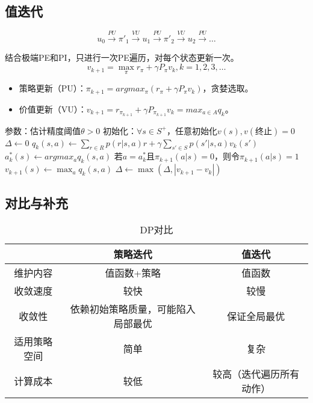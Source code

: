 \documentclass[
12pt, %
a4paper, 
oneside, %
headinclude,footinclude, %
]{scrartcl}
\begin{document}
\subsection[值迭代]{值迭代}
$$ u_0 \xrightarrow{PU} \pi'_1 \xrightarrow{VU} u_1 \xrightarrow{PU} \pi'_2 \xrightarrow{VU} u_2 \xrightarrow{PU} \dots $$

结合极端PE和PI，只进行一次PE遍历，对每个状态更新一次。
$$ v_{k + 1} = \max_{\pi} r_{\pi} + \gamma P_{\pi}v_k, k = 1, 2, 3, \dots $$
\begin{itemize}
\item 策略更新（PU）：$ \pi_{k + 1} = argmax_{\pi}(r_{\pi} + \gamma P_{\pi}v_k) $，贪婪选取。
\item 价值更新（VU）：$ v_{k + 1} = r_{\pi_{k + 1}} + \gamma P_{\pi_{k + 1}}v_k = max_{a \in A} q_k $。
\end{itemize}
\begin{myalgorithm}[值迭代]
\State 参数：估计精度阈值$ \theta > 0 $
\State 初始化：$ \forall s \in S^+ $，任意初始化$ v(s), v(\text{终止}) = 0 $
\Repeat
\State $ \Delta \gets 0 $
\State $ q_k(s, a) \gets \sum_{r \in R} p(r|s, a)r + \gamma \sum_{s' \in S} p(s'|s, a)v_k(s') $
\State $ a^*_k(s) \gets argmax_a q_k(s, a) $ 
\State 若$ a = a^*_k $且$ \pi_{k + 1}(a|s) = 0 $，则令$ \pi_{k + 1}(a|s) = 1 $ 
\State $ v_{k + 1}(s) \gets \max_a q_k(s, a) $ 
\State $ \Delta \gets \max(\Delta, |v_{k + 1} - v_k|) $ 
\EndFor
\EndFor
\Until{$ \Delta < \theta $}
\end{myalgorithm}
\subsection[对比与补充]{对比与补充}\label{sec:DP back}
\begin{table}[H]
\centering
\caption{DP对比}
\begin{tabular}{|c|c|c|}
\hline
& 策略迭代 & 值迭代 \\
\hline
维护内容 & 值函数+策略 & 值函数 \\
\hline
收敛速度 & 较快 & 较慢 \\
\hline
收敛性 & 依赖初始策略质量，可能陷入局部最优 & 保证全局最优 \\
\hline
适用策略空间 & 简单 & 复杂 \\
\hline
计算成本 & 较低 & 较高（迭代遍历所有动作） \\
\hline
\end{tabular}
\end{table}
\end{document}
